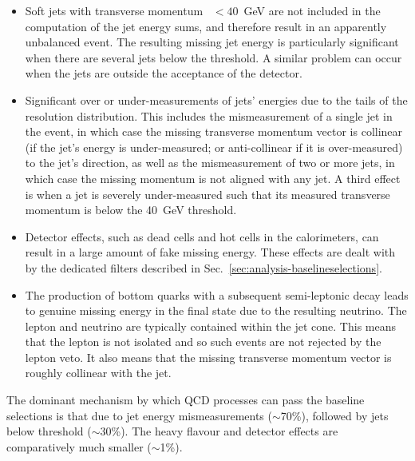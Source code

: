 \begin{itemize}
	\item Soft jets with transverse momentum \pt~$<40$~GeV are not included in 
	the computation of the jet energy sums, and therefore result in an 
	apparently unbalanced event.
	The resulting missing jet energy is particularly significant when there are 
	several jets below the \pt threshold. A similar problem can occur when the 
	jets are outside the acceptance of the detector.
	\item Significant over or under-measurements of jets' energies due to the 
	tails of the resolution distribution. This includes the mismeasurement of a 
	single jet in the event, in which case the missing transverse momentum 
	vector is collinear (if the jet's energy is under-measured; or 
	anti-collinear
	if it is over-measured) to the jet's direction, as well as the 
	mismeasurement of two or more jets, in which case the missing momentum is 
	not aligned with any jet. A third effect is when a jet is severely 
	under-measured such that its measured transverse momentum is below the 
	40~GeV threshold. 
	\item Detector effects, such as dead cells and hot cells in the 
	calorimeters, can result in a large amount of fake missing energy. These 
	effects are dealt with by the dedicated \met filters described in 
	Sec.~\ref{sec:analysis-baselineselections}.
	\item The production of bottom quarks with a subsequent semi-leptonic decay 
	leads to genuine missing energy in the final state due to the resulting 
	neutrino. The lepton and neutrino are typically contained within the jet 
	cone. This means that the lepton is not isolated and so such events are not 
	rejected by the lepton veto. It also means that the missing transverse 
	momentum vector is roughly collinear with the jet. %
\end{itemize}

The dominant mechanism by which QCD processes can pass the baseline selections 
is that due to jet energy mismeasurements ($\sim$70\%), followed by jets below  
threshold ($\sim$30\%). The heavy flavour and detector effects are 
comparatively much smaller ($\sim$1\%).


